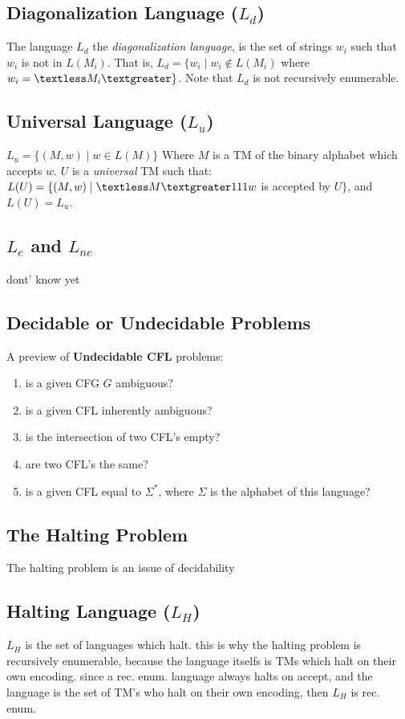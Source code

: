 \documentclass[20pt]{article} %
\begin{document}
\subsection{Diagonalization Language ($L_d$)}
The language $L_d$ the \textit{diagonalization language}, is the set of strings $w_i$ such that $w_i$ is not in $L(M_i)$.  That is, $L_d = \{ w_i \mid w_i \notin L(M_i)$ where $w_i = \textless M_i \textgreater \}$.  Note that $L_d$ is not recursively enumerable.
\subsection{Universal Language ($L_u$)}
$L_u = \{ (M, w) \mid w \in L(M)\}$ Where $M$ is a TM of the binary alphabet which accepts $w$. $U$ is a \textit{universal} TM such that: $L(U) = \{ (M,w) \mid \textless M \textgreater 111 w$ is accepted by $U \}$, and $L(U) = L_u$.
\subsection{$L_e$ and $L_{ne}$}
dont' know yet
\subsection{Decidable or Undecidable Problems}
A preview of \textbf{Undecidable CFL} problems:
\begin{enumerate}
\item is a given CFG $G$ ambiguous?
\item is a given CFL inherently ambiguous?
\item is the intersection of two CFL's empty?
\item are two CFL's the same?
\item is a given CFL equal to $\Sigma^{*}$, where $\Sigma$ is the alphabet of this language?
\end{enumerate}
\subsection{The Halting Problem}
The halting problem is an issue of decidability
\subsection{Halting Language ($L_H$)}
$L_H$ is the set of languages which halt.  this is why the halting problem is recursively enumerable, because the language itselfs is TMs which halt on their own encoding.  since a rec. enum. language always halts on accept, and the language is the set of TM's who halt on their own encoding, then $L_H$ is rec. enum.
\end{document}
